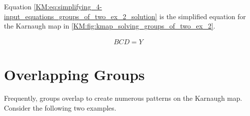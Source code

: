 Equation \ref{KM:eq:simplifying_4-input_equations_groups_of_two_ex_2_solution} is the simplified equation for the Karnaugh map in \ref{KM:fig:kmap_solving_groups_of_two_ex_2}. 

\begin{align}
  \label{KM:eq:simplifying_4-input_equations_groups_of_two_ex_2_solution}
  BCD = Y
\end{align}

\section{Overlapping Groups}
\label{KM:sec:overlapping_groups}

Frequently, groups overlap to create numerous patterns on the Karnaugh map. Consider the following two examples. 


